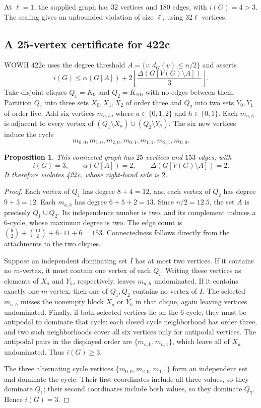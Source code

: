 \documentclass[11pt,a4paper]{article}
\newtheorem{proposition}[theorem]{Proposition}
\theoremstyle{remark}
\begin{document}
At $\ell=1$, the supplied graph has $32$ vertices and $180$ edges, with
$i(G)=4>3$.  The scaling gives an unbounded violation of size $\ell$,
using $32\ell$ vertices.

\subsection{A 25-vertex certificate for 422c}
\label{r7id:422c}

WOWII 422c uses the degree threshold
$A=\{v:d_G(v)\leq n/2\}$ and asserts
\[
 i(G)\leq\alpha(G[A])+
 2\left\lfloor\frac{\Delta(G[V(G)\setminus A])}{3}\right\rfloor.
\]
Take disjoint cliques $Q_1=K_9$ and $Q_2=K_{10}$, with no edges between
them.  Partition $Q_1$ into three sets $X_0,X_1,X_2$ of order three and
$Q_2$ into two sets $Y_0,Y_1$ of order five.
Add six vertices $m_{a,h}$, where $a\in\{0,1,2\}$ and $h\in\{0,1\}$.
Each $m_{a,h}$ is adjacent to every vertex of
$(Q_1\setminus X_a)\cup(Q_2\setminus Y_h)$.
The six new vertices induce the cycle
\[
 m_{0,0},m_{1,0},m_{2,0},m_{0,1},m_{1,1},m_{2,1},m_{0,0}.
\]

\begin{proposition}\label{r7id:422c-values}
This connected graph has $25$ vertices and $153$ edges, with
\[
 i(G)=3,
 \qquad\alpha(G[A])=2,
 \qquad\Delta(G[V(G)\setminus A])=2.
\]
It therefore violates 422c, whose right-hand side is $2$.
\end{proposition}
\begin{proof}
Each vertex of $Q_1$ has degree $8+4=12$, and each vertex of $Q_2$ has
degree $9+3=12$.  Each $m_{a,h}$ has degree $6+5+2=13$.
Since $n/2=12.5$, the set $A$ is precisely $Q_1\cup Q_2$.
Its independence number is two, and its complement induces a $6$-cycle,
whose maximum degree is two.  The edge count is
$\binom92+\binom{10}2+6\cdot11+6=153$.
Connectedness follows directly from the attachments to the two cliques.

Suppose an independent dominating set $I$ has at most two vertices.
If it contains no $m$-vertex, it must contain one vertex of each $Q_i$.
Writing these vertices as elements of $X_a$ and $Y_h$, respectively,
leaves $m_{a,h}$ undominated.
If it contains exactly one $m$-vertex, then one of $Q_1,Q_2$ contains no
vertex of $I$.  The selected $m_{a,h}$ misses the nonempty block $X_a$
or $Y_h$ in that clique, again leaving vertices undominated.
Finally, if both selected vertices lie on the $6$-cycle, they must be
antipodal to dominate that cycle: each closed cycle neighborhood has
order three, and two such neighborhoods cover all six vertices only
for antipodal vertices.  The antipodal pairs in the displayed order are
$\{m_{a,0},m_{a,1}\}$, which leave all of $X_a$ undominated.
Thus $i(G)\geq3$.

The three alternating cycle vertices
$\{m_{0,0},m_{2,0},m_{1,1}\}$ form an independent set and dominate the
cycle.  Their first coordinates include all three values, so they
dominate $Q_1$; their second coordinates include both values, so they
dominate $Q_2$.  Hence $i(G)=3$.
\end{proof}
\end{document}
